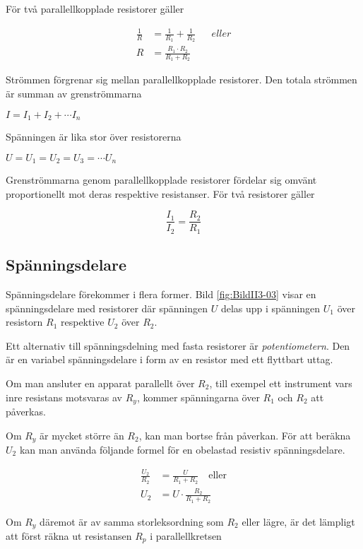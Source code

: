 För två parallellkopplade resistorer gäller

\begin{align*}
\frac{1}{R} &= \frac{1}{R_1} + \frac{1}{R_2} && eller \\
R &= \frac{R_1 \cdot R_2}{R_1 + R_2}
\end{align*}

Strömmen förgrenar sig mellan parallellkopplade resistorer.
Den totala strömmen är summan av grenströmmarna

\( I = I_1 + I_2 + \cdots I_n \)

Spänningen är lika stor över resistorerna

\(U = U_1 = U_2 = U_3 = \cdots U_n \)

Grenströmmarna genom parallellkopplade resistorer fördelar sig omvänt
proportionellt mot deras respektive resistanser.
För två resistorer gäller

\[\frac{I_1}{I_2} = \frac{R_2}{R_1}\]

\subsection{Spänningsdelare}


Spänningsdelare förekommer i flera former.
Bild \ref{fig:BildII3-03} visar en spänningsdelare med resistorer där
spänningen \(U\) delas upp i spänningen \(U_1\) över resistorn \(R_1\)
respektive \(U_2\) över \(R_2\).

Ett alternativ till spänningsdelning med fasta resistorer är \emph{potentiometern}. 
Den är en variabel spänningsdelare i form av en resistor med ett flyttbart uttag.

Om man ansluter en apparat parallellt över \(R_2\), till exempel ett instrument
vars inre resistans motsvaras av \(R_y\), kommer spänningarna över \(R_1\)
och \(R_2\) att påverkas.

Om \(R_y\) är mycket större än \(R_2\), kan man bortse från påverkan.
För att beräkna \(U_2\) kan man använda följande formel för en obelastad
resistiv spänningsdelare.

\begin{align*}
\frac{U_2}{R_2} &= \frac{U}{R_1 + R_2} \quad \text{eller} \\
U_2 &= U \cdot \frac{R_2}{R_1 + R_2}
\end{align*}

Om \(R_y\) däremot är av samma storleksordning som \(R_2\) eller lägre, är det lämpligt att först räkna ut resistansen \(R_p\) i parallellkretsen 

